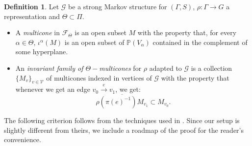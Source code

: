\documentclass{amsart}
\theoremstyle{remark}
\theoremstyle{definition}
\newtheorem{defi}[thm]{Definition}
\begin{document}
\begin{defi}
 Let $\mathcal{G}$ be a strong Markov structure for $(\Gamma,S)$, $\rho : \Gamma \rightarrow G$ a representation and $\Theta \subset \Pi$.
   \begin{itemize}
      \item A \emph{multicone} in $\mathcal{F}_\Theta$ is an open subset $M$ with the property that, for every $\alpha \in \Theta$, $\iota^\alpha (M)$ is an open subset of $\mathbb{P} (V_\alpha)$ contained in the complement of some hyperplane.
      \item An \emph{invariant family of  $\Theta-$multicones} for $\rho$ adapted to $\mathcal{G}$ is a collection $\{M_v\}_{v \in \mathcal{V}}$ of multicones indexed in vertices of $\mathcal{G}$ with the property that whenever we get an edge $v_0 \xrightarrow{e} v_1$, we get:
      $$\overline{\rho(\pi (e)^{-1}) M_{v_1}} \subset M_{v_0}.$$ 
   \end{itemize}
\end{defi}

The following criterion follows from the techniques used in \cite{bochi2019anosov}.
Since our setup is slightly different from theirs, we include a roadmap of the proof for the reader's convenience.
\end{document}
